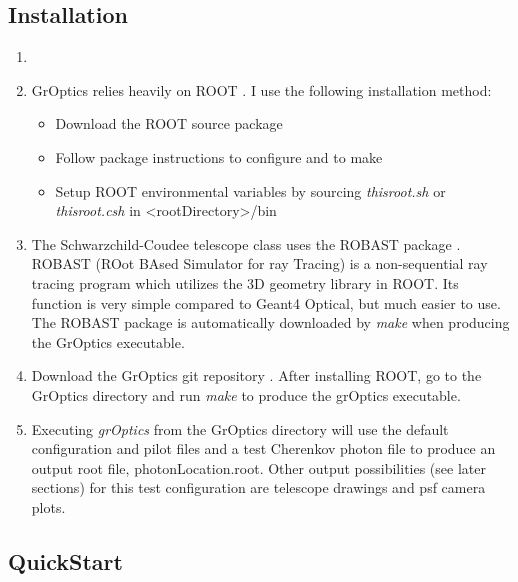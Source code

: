 \documentclass{article}
\begin{document}
\subsection{Installation}\label{SS:INSTALL}

\begin{enumerate}
\item
    
\item
  GrOptics relies heavily on ROOT \cite{ROOT}.  I use the following
  installation method:
  \begin{itemize} 
    \item Download the ROOT source package \cite{ROOT}
    \item Follow package instructions to configure and to make
    \item Setup ROOT environmental variables by sourcing \emph{thisroot.sh}
      or \emph{thisroot.csh} in \textless rootDirectory\textgreater/bin
  \end{itemize}
  \item 
  The Schwarzchild-Coudee telescope class uses the ROBAST 
  package \cite{ROBAST}. 
  ROBAST (ROot BAsed Simulator for ray Tracing) is a non-sequential 
  ray tracing program which utilizes the 3D geometry library in ROOT. 
  Its function is very simple compared to Geant4 Optical, 
  but much easier to use. The ROBAST package is automatically downloaded
  by \emph{make} when producing the GrOptics executable.
 
\item
  Download the GrOptics git repository \cite{GROPTICS}. After installing
  ROOT, go to the GrOptics directory and run \emph{make} to produce the 
  grOptics executable.

\item
  Executing \emph{grOptics} from the GrOptics directory will use the
  default configuration and pilot files and a test Cherenkov photon file
  to produce an output root file, photonLocation.root. Other output 
  possibilities (see later sections) for this test configuration are 
  telescope drawings and psf camera plots.

\end{enumerate}


\subsection{QuickStart}\label{SS:QSTART}

\end{document}
